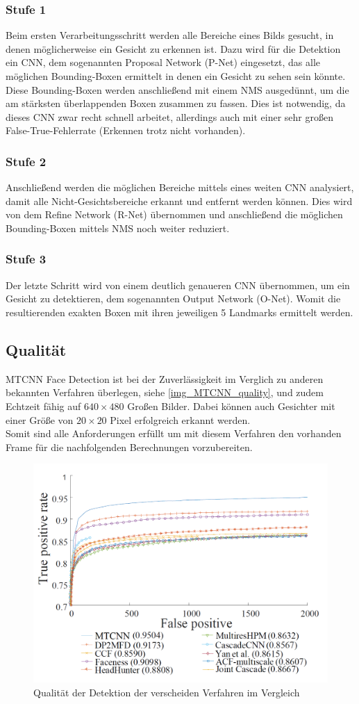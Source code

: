 \subsubsection{Stufe 1}
Beim ersten Verarbeitungsschritt werden alle Bereiche eines Bilds gesucht, in denen möglicherweise ein Gesicht zu erkennen ist. Dazu wird für die Detektion ein CNN, dem sogenannten Proposal Network (P-Net) eingesetzt, das alle möglichen Bounding-Boxen ermittelt in denen ein Gesicht zu sehen sein könnte. Diese Bounding-Boxen werden anschließend mit einem NMS ausgedünnt, um die am stärksten überlappenden Boxen zusammen zu fassen. Dies ist notwendig, da dieses CNN zwar recht schnell arbeitet, allerdings auch mit einer sehr großen False-True-Fehlerrate (Erkennen trotz nicht vorhanden).
\subsubsection{Stufe 2}
Anschließend werden die möglichen Bereiche mittels eines weiten CNN analysiert, damit alle Nicht-Gesichtsbereiche erkannt und entfernt werden können. Dies wird von dem Refine Network (R-Net) übernommen und anschließend die möglichen Bounding-Boxen mittels NMS noch weiter reduziert.
\subsubsection{Stufe 3}
Der letzte Schritt wird von einem deutlich genaueren CNN übernommen, um ein Gesicht zu detektieren, dem sogenannten Output Network (O-Net). Womit die resultierenden exakten Boxen mit ihren jeweiligen 5 Landmarks ermittelt werden.
\subsection{Qualität}
MTCNN Face Detection ist bei der Zuverlässigkeit im Verglich zu anderen bekannten Verfahren überlegen, siehe \autoref{img_MTCNN_quality}, und zudem Echtzeit fähig auf $640\times 480$ Großen Bilder. Dabei können auch Gesichter mit einer Größe von $20\times 20$ Pixel erfolgreich erkannt werden.\\
Somit sind alle Anforderungen erfüllt um mit diesem Verfahren den vorhanden Frame für die nachfolgenden Berechnungen vorzubereiten.
\begin{figure}
	\centering
	\includegraphics[width=0.7\linewidth]{img/MTCNN_quality}
	\caption{Qualität der Detektion der verscheiden Verfahren im Vergleich \cite{MTCCN}}
	\label{img_MTCNN_quality}
\end{figure}
